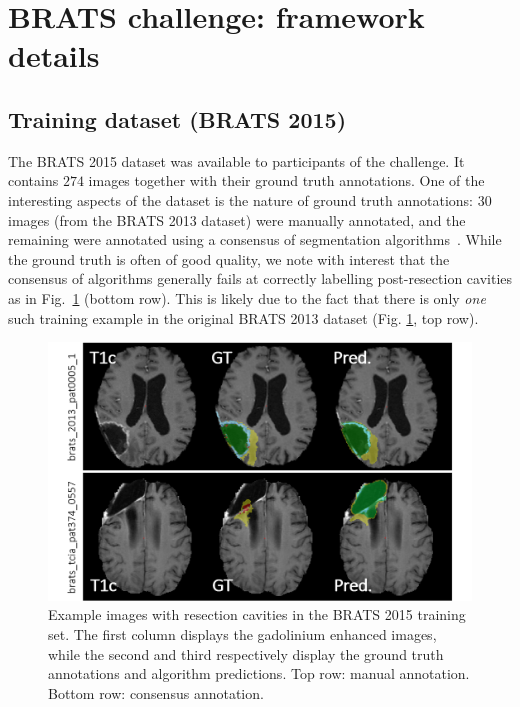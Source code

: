 
\section{BRATS challenge: framework details}
\label{sec: results}

\subsection{Training dataset (BRATS 2015)}

The BRATS 2015 dataset was available to participants of the challenge. 
It contains $274$ images together with their ground truth annotations. 
One of the interesting aspects of the dataset is the nature of ground truth annotations: $30$ images 
(from the BRATS 2013 dataset) were manually annotated, and the remaining were annotated using a consensus of 
segmentation algorithms~\cite{menze2015multimodal}. 
While the ground truth is often of good quality, we note with interest that the consensus of algorithms generally fails at correctly labelling post-resection cavities as in Fig.~\ref{fig:post-resection-cavities} (bottom row). This is likely due to the fact that there is only \textit{one} such training example in the original BRATS 2013 dataset (Fig. \ref{fig:post-resection-cavities}, top row). 

\begin{figure}
\centering
\includegraphics[width=1\textwidth]{images/BRATS2015_post-resection-cavities.png}
\caption{Example images with resection cavities in the BRATS 2015 training set. The first column displays the gadolinium enhanced images, while the second and third respectively display the ground truth annotations and algorithm predictions. Top row: manual annotation. Bottom row: consensus annotation.}
\label{fig:post-resection-cavities}
\end{figure}

